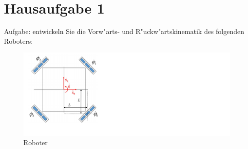 \documentclass[11pt]{article}
\begin{document}
    \section{Hausaufgabe 1}\label{sec:home}
    Aufgabe: entwickeln Sie die Vorw"arts- und R"uckw"artskinematik des folgenden Roboters:
    \begin{figure}[H]
        \includegraphics{../images/aufgabeDOriginal.png}
        \caption{Roboter}
        \label{fig:rob}
    \end{figure}
\end{document}
